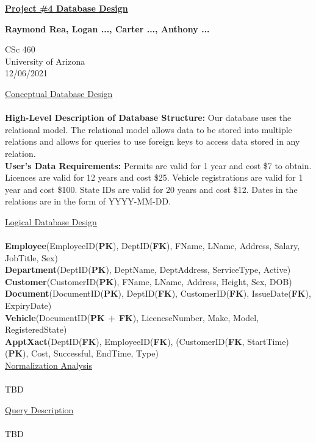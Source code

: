 \documentclass[12pt]{article}   %
\begin{document}
\begin{titlepage}
   \begin{center}
       \vspace*{1cm}

       \underline{\textbf{Project \#4 Database Design}}

       \vspace{1.5cm}

       \textbf{Raymond Rea, Logan ..., Carter ..., Anthony ...}

       \vfill
            
       CSc 460\\
       University of Arizona\\
       12/06/2021
            
   \end{center}
\end{titlepage}
\newpage


\underline{Conceptual Database Design}\\
\\
\textbf{High-Level Description of Database Structure:} Our database uses the relational model. The relational model allows data to be stored into multiple relations and allows for queries to use foreign keys to access data stored in any relation.\\

\textbf{User's Data Requirements:} Permits are valid for 1 year and cost \$7 to obtain. Licences are valid for 12 years and cost \$25. Vehicle registrations are valid for 1 year and cost \$100. State IDs are valid for 20 years and cost \$12. Dates in the relations are in the form of YYYY-MM-DD.

\underline{Logical Database Design}\\
\\
\textbf{Employee}(EmployeeID(\textbf{PK}), DeptID(\textbf{FK}), FName, LName, Address, Salary, JobTitle, Sex)\\

\textbf{Department}(DeptID(\textbf{PK}), DeptName, DeptAddress, ServiceType, Active)\\

\textbf{Customer}(CustomerID(\textbf{PK}), FName, LName, Address, Height, Sex, DOB)\\

\textbf{Document}(DocumentID(\textbf{PK}), DeptID(\textbf{FK}), CustomerID(\textbf{FK}), IssueDate(\textbf{FK}), ExpiryDate)\\

\textbf{Vehicle}(DocumentID(\textbf{PK + FK}), LicencseNumber, Make, Model, RegisteredState)\\

\textbf{ApptXact}(DeptID(\textbf{FK}), EmployeeID(\textbf{FK}), (CustomerID(\textbf{FK}, StartTime)(\textbf{PK}), Cost, Successful, EndTime, Type)\\

\underline{Normalization Analysis}\\
\\
TBD

\underline{Query Description}\\
\\ 
TBD
\end{document}
